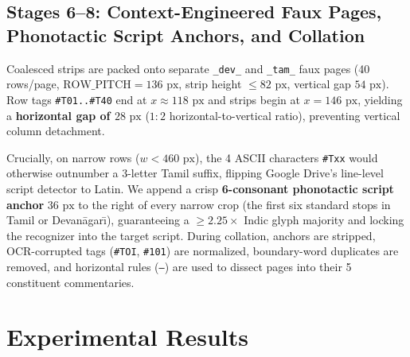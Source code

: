 \documentclass[10pt,twocolumn]{article}
\begin{document}
\subsection{Stages 6--8: Context-Engineered Faux Pages, Phonotactic Script Anchors, and Collation}
Coalesced strips are packed onto separate \texttt{\_dev\_} and \texttt{\_tam\_} faux pages (40 rows/page, $\text{ROW\_PITCH} = 136\text{ px}$, strip height $\le 82\text{ px}$, vertical gap $54\text{ px}$). Row tags \texttt{\#T01..\#T40} end at $x \approx 118\text{ px}$ and strips begin at $x = 146\text{ px}$, yielding a \textbf{horizontal gap of $28\text{ px}$} ($1:2$ horizontal-to-vertical ratio), preventing vertical column detachment.

Crucially, on narrow rows ($w < 460\text{ px}$), the 4 ASCII characters \texttt{\#Txx} would otherwise outnumber a 3-letter Tamil suffix, flipping Google Drive's line-level script detector to Latin. We append a crisp \textbf{6-consonant phonotactic script anchor} $36\text{ px}$ to the right of every narrow crop (the first six standard stops in Tamil or Devan\={a}gar\={\i}), guaranteeing a $\ge 2.25\times$ Indic glyph majority and locking the recognizer into the target script. During collation, anchors are stripped, OCR-corrupted tags (\texttt{\#TOI}, \texttt{\#101}) are normalized, boundary-word duplicates are removed, and horizontal rules (\texttt{---}) are used to dissect pages into their 5 constituent commentaries.

\section{Experimental Results}
\end{document}

